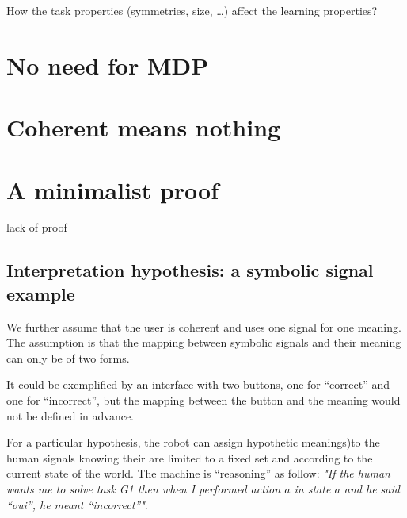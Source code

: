 How the task properties (symmetries, size, \ldots) affect the learning properties?

\section{No need for MDP}


\section{Coherent means nothing}


\section{A minimalist proof}

lack of proof

\subsection{Interpretation hypothesis: a symbolic signal example}

We further assume that the user is coherent and uses one signal for one meaning. The assumption is that the mapping between symbolic signals and their meaning can only be of two forms.

It could be exemplified by an interface with two buttons, one for ``correct'' and one for ``incorrect'', but the mapping between the button and the meaning would not be defined in advance.


For a particular hypothesis, the robot can assign hypothetic meanings)to the human signals knowing their are limited to a fixed set and according to the current state of the world. The machine is ``reasoning'' as follow: \emph{"If the human wants me to solve task G1 then when I performed action $a$ in state $a$ and he said ``oui'', he meant ``incorrect''"}. 

